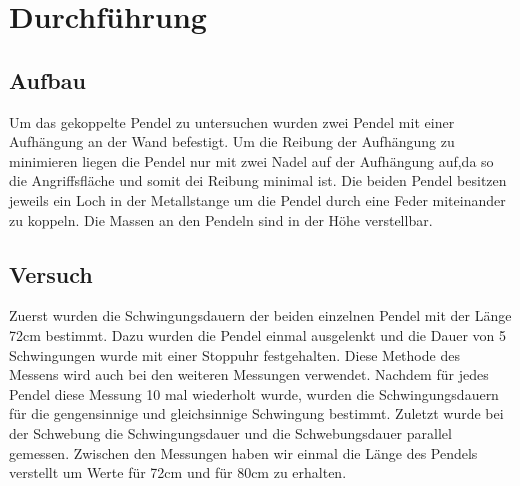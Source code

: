 \section{Durchführung}
\label{sec:Durchfuehrung}
\subsection{Aufbau}
    Um das gekoppelte Pendel zu untersuchen wurden zwei Pendel mit einer Aufhängung an der Wand befestigt.
    Um die Reibung der Aufhängung zu minimieren liegen die Pendel nur mit zwei Nadel auf der Aufhängung auf,da so die Angriffsfläche und somit dei Reibung minimal ist.
    Die beiden Pendel besitzen jeweils ein Loch in der Metallstange um die Pendel durch eine Feder miteinander zu koppeln.
    Die Massen an den Pendeln sind in der Höhe verstellbar.
\subsection{Versuch}
    Zuerst wurden die Schwingungsdauern der beiden einzelnen Pendel mit der Länge 72cm bestimmt.
    Dazu wurden die Pendel einmal ausgelenkt und die Dauer von 5 Schwingungen wurde mit einer Stoppuhr festgehalten.
    Diese Methode des Messens wird auch bei den weiteren Messungen verwendet.
    Nachdem für jedes Pendel diese Messung 10 mal wiederholt wurde, wurden die Schwingungsdauern für die gengensinnige und gleichsinnige Schwingung bestimmt.
    Zuletzt wurde bei der Schwebung die Schwingungsdauer und die Schwebungsdauer parallel gemessen.
    Zwischen den Messungen haben wir einmal die Länge des Pendels verstellt um Werte für 72cm und für 80cm zu erhalten.